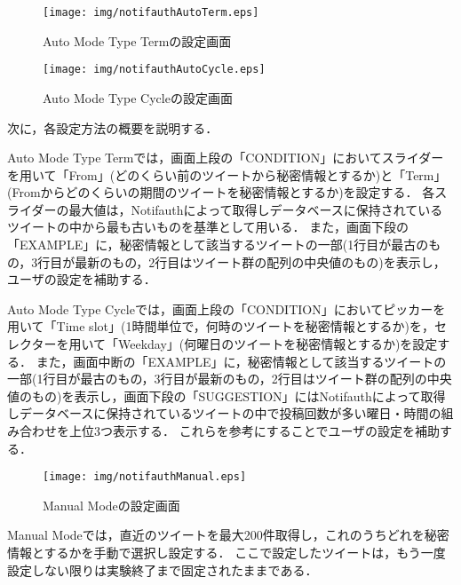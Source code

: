 \begin{figure}[ht]
  \begin{minipage}{0.5\hsize}
    \begin{center}
      \texttt{[image: img/notifauthAutoTerm.eps]}
    \end{center}
    \caption{Auto Mode Type Termの設定画面}
    \label{fig:notifauthAutoTerm}
  \end{minipage}
  \begin{minipage}{0.5\hsize}
    \begin{center}
      \texttt{[image: img/notifauthAutoCycle.eps]}
    \end{center}
    \caption{Auto Mode Type Cycleの設定画面}
    \label{fig:notifauthAutoCycle}
  \end{minipage}
\end{figure}

次に，各設定方法の概要を説明する．

Auto Mode Type Termでは，画面上段の「CONDITION」においてスライダーを用いて「From」(どのくらい前のツイートから秘密情報とするか)と「Term」(Fromからどのくらいの期間のツイートを秘密情報とするか)を設定する．
各スライダーの最大値は，Notifauthによって取得しデータベースに保持されているツイートの中から最も古いものを基準として用いる．
また，画面下段の「EXAMPLE」に，秘密情報として該当するツイートの一部(1行目が最古のもの，3行目が最新のもの，2行目はツイート群の配列の中央値のもの)を表示し，ユーザの設定を補助する．

Auto Mode Type Cycleでは，画面上段の「CONDITION」においてピッカーを用いて「Time slot」(1時間単位で，何時のツイートを秘密情報とするか)を，セレクターを用いて「Weekday」(何曜日のツイートを秘密情報とするか)を設定する．
また，画面中断の「EXAMPLE」に，秘密情報として該当するツイートの一部(1行目が最古のもの，3行目が最新のもの，2行目はツイート群の配列の中央値のもの)を表示し，画面下段の「SUGGESTION」にはNotifauthによって取得しデータベースに保持されているツイートの中で投稿回数が多い曜日・時間の組み合わせを上位3つ表示する．
これらを参考にすることでユーザの設定を補助する．

\begin{figure}
  \begin{center}
    \texttt{[image: img/notifauthManual.eps]}
  \end{center}
  \caption{Manual Modeの設定画面}
  \label{fig:notifauthManual}
\end{figure}

Manual Modeでは，直近のツイートを最大200件取得し，これのうちどれを秘密情報とするかを手動で選択し設定する．
ここで設定したツイートは，もう一度設定しない限りは実験終了まで固定されたままである．

